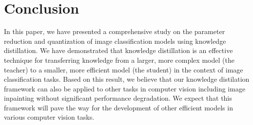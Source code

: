 \section{Conclusion}

In this paper, we have presented a comprehensive study
on the parameter reduction and quantization of image classification models using knowledge distillation.
We have demonstrated that knowledge distillation is an effective technique
for transferring knowledge from a larger, more complex model (the teacher)
to a smaller, more efficient model (the student)
in the context of image classification tasks.
Based on this result, we believe that our knowledge distilation framework can also be applied
to other tasks in computer vision including image inpainting
without significant performance degradation.
We expect that this framework will pave the way for the development of other efficient models
in various computer vision tasks.